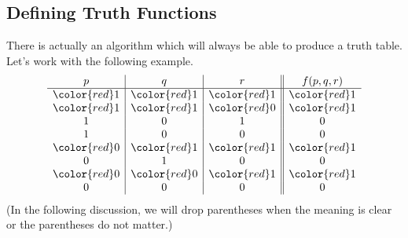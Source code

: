 \subsection{Defining Truth Functions}
There is actually an algorithm which will always be able to produce a truth table. Let's work with the following example.
\[\begin{array}{c|c|c||c}
	p & q & r & f(p,q,r) \\
	\hline
	\color{red}1 & \color{red}1 & \color{red}1 & \color{red}1 \\
	\color{red}1 & \color{red}1 & \color{red}0 & \color{red}1 \\
	1 & 0 & 1 & 0 \\
	1 & 0 & 0 & 0 \\
	\color{red}0 & \color{red}1 & \color{red}1 & \color{red}1 \\
	0 & 1 & 0 & 0 \\
	\color{red}0 & \color{red}0 & \color{red}1 & \color{red}1 \\
	0 & 0 & 0 & 0
\end{array}\]
(In the following discussion, we will drop parentheses when the meaning is clear or the parentheses do not matter.)

